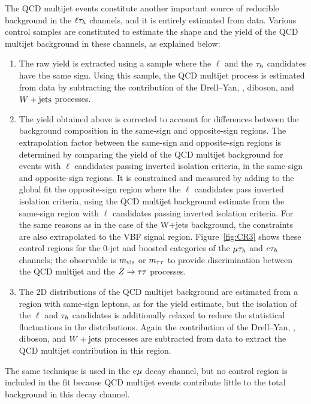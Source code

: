 The QCD multijet events constitute another important source of reducible background in the $\ell \tau_{h}$ channels, and it is entirely estimated from data. Various control samples are constituted to estimate the shape and the yield of the QCD multijet background in these channels, as explained below:
\begin{enumerate}
\item The raw yield is extracted using a sample where the
$\ell$ and the $\tau_{h}$ candidates have the same sign. Using this sample, the QCD multijet process is estimated from data by subtracting the contribution of the Drell--Yan, \ttbar, diboson,
and $W+\text{jets}$ processes.
\item The yield obtained above is corrected to account for differences between the background composition in the same-sign and opposite-sign regions. The extrapolation factor between the same-sign and opposite-sign regions is determined by comparing the yield of the QCD multijet background for events with $\ell$ candidates passing inverted isolation criteria, in the same-sign and opposite-sign regions. It is constrained and measured by adding to the global fit the opposite-sign region where the $\ell$ candidates pass inverted isolation criteria, using the QCD multijet background estimate from the same-sign region with $\ell$ candidates passing inverted isolation criteria. For the same reasons as in the case of the W+jets background, the constraints are also extrapolated to the VBF signal region. Figure~\ref{fig:CR3} shows these control regions for the 0-jet and boosted categories of the $\mu\tau_{h}$ and $e\tau_{h}$ channels; the observable is $m_\text{vis}$ or $m_{\tau\tau}$ to provide discrimination between the QCD multijet and the $Z\to\tau\tau$ processes.
\item The 2D distributions of the QCD multijet background are estimated from a region with same-sign leptons, as for the yield estimate, but the isolation of the $\ell$ and $\tau_{h}$ candidates is additionally relaxed to reduce the statistical fluctuations in the distributions. Again the contribution of the Drell--Yan, \ttbar, diboson,
and $W+ \text{jets}$ processes are subtracted from data to extract the QCD multijet contribution in this region.
\end{enumerate}
The same technique is used in the $e\mu$ decay channel, but no control region is included in the fit because QCD multijet events contribute little to the total background in this decay channel.

